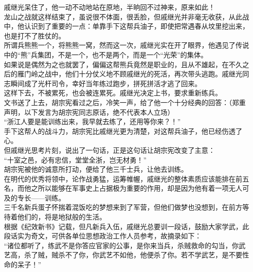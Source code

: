 \begin{multicols}{\theparacolNo}
戚继光呆住了，他一动不动地站在原地，半晌回不过神来，原来如此！\\

龙山之战就这样结束了，虽说很不体面，很丢脸，但戚继光并非毫无收获，从此战中，他认识到了重要的一点：单靠手下这帮兵油子，即使把常遇春从坟里挖出来，也是打不了胜仗的。\\

所谓兵熊熊一个，将熊熊一窝，然而这一次，戚继光实在开了眼界，他遇见了传说中的“熊”兵集团，不是一个，也不是两个，而是一个“光荣”的集体。\\

如果说是偶然为之也就罢了，偏偏这帮熊兵竟然是职业的，且从不雄起，在不久之后的雁门岭之战中，他们十分仗义地不顾戚继光的死活，再次带头逃跑。戚继光同志瞬间成了光杆司令，幸好当年练过跑步，拼死拼活才逃了回来。\\

这样下去，不被累死，也会被连累死。戚继光决定上书，要求重新练兵。\\

文书送了上去，胡宗宪看过之后，冷笑一声，给了他一个十分经典的回答：（郑重声明，以下发言为胡宗宪同志原话，绝不代表本人立场）\\

“浙江人要是能训练出来，我早就去练了，还用等你来？！”\\

手下这帮人的战斗力，胡宗宪比戚继光更为清楚，对这帮兵油子，他已经伤透了心。\\

但戚继光思考片刻，说出了一句话，正是这句话让胡宗宪改变了主意：\\

“十室之邑，必有忠信，堂堂全浙，岂无材勇！”\\

胡宗宪被他的诚意所打动，便给了他三千士兵，让他去训练。\\

在明代的优秀将领中，论作战勇猛，运筹帷幄，戚继光的整体素质应该能排在前五名，而他之所以能够在军事史上占据极为重要的作用，却是因为他有着一项无人可及的专长——训练。\\

三千名新兵蛋子怀揣着混饭吃的梦想来到了军营，但他们做梦也没想到，在前方等待着他们的，将是地狱般的生活。\\

根据《纪效新书》记载，但凡新兵入伍，戚继光总要训一段话，鼓励大家学武，此段话实为奇文，可供各单位思想政治工作人员参考，故摘录如下：\\

“诸位都听了，练武不是你答应官家的公事，是你来当兵，杀贼救命的勾当，你武艺高，杀了贼，贼杀不了你，你武艺不如他，他便杀了你。若不学武艺，是不要性命的呆子！”\\


\end{multicols}
